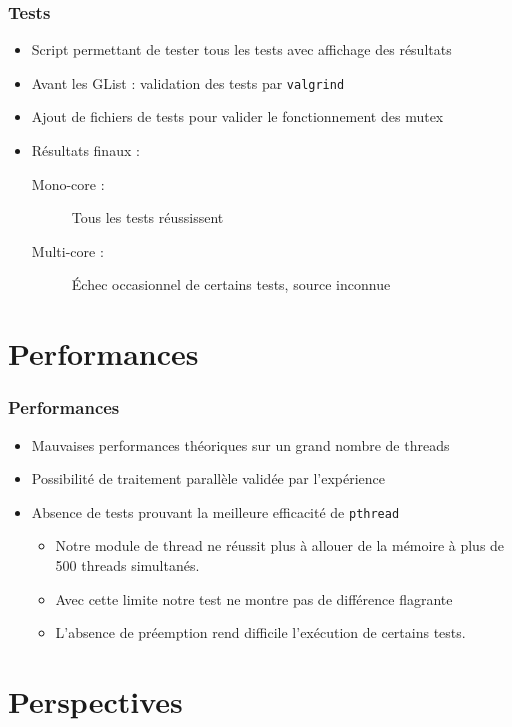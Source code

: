 \documentclass{beamer}
\begin{document}
\begin{frame}[containsverbatim]
  \frametitle{Tests}
  \begin{itemize}
    \item Script permettant de tester tous les tests avec affichage des
      résultats
    \item Avant les GList : validation des tests par \verb!valgrind!
    \item Ajout de fichiers de tests pour valider le fonctionnement des mutex
    \item Résultats finaux :
      \begin{description}
        \item[Mono-core :] Tous les tests réussissent
        \item[Multi-core :] Échec occasionnel de certains tests, source
          inconnue
      \end{description}
  \end{itemize}
\end{frame}

\section{Performances}

\begin{frame}
  \frametitle{Performances}
  \begin{itemize}
    \item Mauvaises performances théoriques sur un grand nombre de threads
    \item Possibilité de traitement parallèle validée par l'expérience
    \item Absence de tests prouvant la meilleure efficacité de \verb!pthread!
      \begin{itemize}
        \item Notre module de thread ne réussit plus à allouer de la mémoire
          à plus de 500 threads simultanés.
        \item Avec cette limite notre test ne montre pas de différence
          flagrante
        \item L'absence de préemption rend difficile l'exécution de certains
          tests.
      \end{itemize}
  \end{itemize}
\end{frame}

\section{Perspectives}
\end{document}
